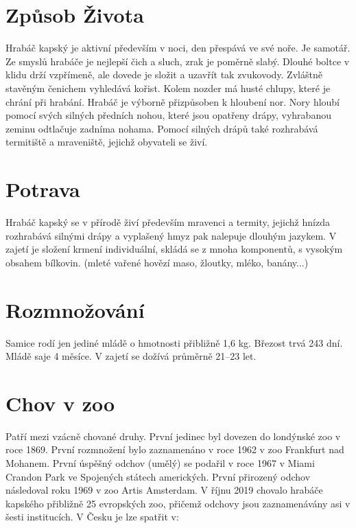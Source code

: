 \documentclass[a4paper, 12pt]{article}
\begin{document}
\section{Způsob Života}

Hrabáč kapský je aktivní především v noci, den přespává ve své noře. Je samotář.
Ze smyslů hrabáče je nejlepší čich a sluch, zrak je poměrně slabý. Dlouhé boltce v klidu drží vzpřímeně,
ale dovede je složit a uzavřít tak zvukovody. Zvláštně stavěným čenichem vyhledává kořist.
Kolem nozder má husté chlupy, které je chrání při hrabání. Hrabáč je výborně přizpůsoben k hloubení nor.
Nory hloubí pomocí svých silných předních nohou, které jsou opatřeny drápy, vyhrabanou zeminu odtlačuje zadníma nohama.
Pomocí silných drápů také rozhrabává termitiště a mraveniště, jejichž obyvateli se živí.

\section{Potrava}

Hrabáč kapský se v přírodě živí především mravenci a termity, jejichž hnízda rozhrabává
silnými drápy a vyplašený hmyz pak nalepuje dlouhým jazykem. V zajetí je složení krmení individuální,
skládá se z mnoha komponentů, s vysokým obsahem bílkovin.
(mleté vařené hovězí maso, žloutky, mléko, banány...)

\section{Rozmnožování}

Samice rodí jen jediné mládě o hmotnosti přibližně 1,6 kg. Březost trvá 243 dní.
Mládě saje 4 měsíce. V zajetí se dožívá průměrně 21--23 let.

\section{Chov v zoo}

Patří mezi vzácně chované druhy. První jedinec byl dovezen do londýnské zoo v roce 1869.
První rozmnožení bylo zaznamenáno v roce 1962 v zoo Frankfurt nad Mohanem.
První úspěšný odchov (umělý) se podařil v roce 1967 v Miami Crandon Park ve Spojených státech amerických.
První přirozený odchov následoval roku 1969 v zoo Artis Amsterdam.
V říjnu 2019 chovalo hrabáče kapského přibližně 25 evropských zoo,
přičemž odchovy jsou zaznamenávány asi v šesti institucích. V Česku je lze spatřit v:
\end{document}
